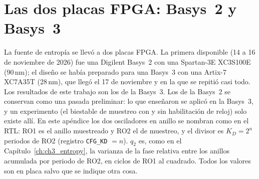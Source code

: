 
\chapter{Las dos placas FPGA: Basys~2 y Basys~3}
\label{app:fpga}

La fuente de entropía se llevó a dos placas \ac{FPGA}. La primera
disponible (14 a 16 de noviembre de 2026) fue una Digilent Basys~2 con una
Spartan-3E XC3S100E (90\,nm); el diseño se había preparado para una
Basys~3 con una Artix-7 XC7A35T (28\,nm), que llegó el 17 de noviembre y
en la que se repitió casi todo. Los resultados de este trabajo son los de
la Basys~3. Los de la Basys~2 se conservan como una pasada preliminar: lo
que enseñaron se aplicó en la Basys~3, y un experimento (el biestable de
muestreo con y sin habilitación de reloj) solo existe allí. En este
apéndice los dos osciladores en anillo se nombran como en el \ac{RTL}: RO1
es el anillo muestreado y RO2 el de muestreo, y el divisor es
$K_D = 2^{n}$ periodos de RO2 (registro \texttt{CFG\_KD} $= n$). $q_2$ es, como
en el Capítulo~\ref{ch:ch3_entropy}, la varianza de la fase relativa
entre los anillos acumulada por periodo de RO2, en ciclos de RO1 al
cuadrado. Todos los valores son \meas{} en placa
salvo que se indique otra cosa.

